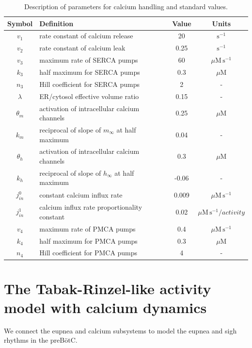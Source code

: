 \documentclass[12pt]{article}
\def\pre{preB\"otC\xspace}
\def\micromolar{\mu\mathrm{M}}
\def\persecond{\mathrm{s}^{-1}}
\def\micromolarpersecond{\mu\mathrm{M}\,\mathrm{s}^{-1}}
\def\jin{j_{in}}
\def\jinzero{\jin^0}
\def\jinone{\jin^1}
\def\minf{m_\infty}
\def\hinf{h_\infty}
\def\thetam{\theta_m}
\def\km{k_m}
\def\thetah{\theta_h}
\def\kh{k_h}
\begin{document}
\begin{table}[h!]
\centering 
\begin{tabular}{clcc}
    Symbol & Definition & Value &Units  \\
\hline 
\hline
$v_1$ & rate constant of calcium release & 20  & $\persecond$  \\
$v_2$ & rate constant of calcium leak   & 0.25 & $\persecond$ \\
$v_3$ & maximum rate of SERCA pumps & 60  &  $\micromolarpersecond$  \\
$k_3$ & half maximum for SERCA pumps  & 0.3 & $\micromolar$ \\
$n_3$ & Hill coefficient for SERCA pumps   & 2 & - \\
$\lambda$ & ER/cytosol effective volume ratio & 0.15 & - \\
$\thetam$ & activation of intracellular calcium channels & 0.25 & $\micromolar$ \\
$\km$ & reciprocal of slope of   $\minf$ at half maximum & 0.04 & - \\
$\thetah$ & activation of intracellular calcium channels & 0.3 & $\micromolar$\\
$\kh$ & reciprocal of slope of   $\hinf$ at half maximum & -0.06 & - \\
    \hline 
 $\jinzero$ & constant calcium influx rate  & 0.009 & $\micromolarpersecond$ \\
  $\jinone$ &  calcium influx rate  proportionality constant & 0.02 & $\micromolarpersecond/activity$ \\
  $v_4$ & maximum rate of PMCA pumps & 0.4  & $\micromolarpersecond$ \\
$k_4$ & half maximum for PMCA pumps  & 0.3 & $\micromolar$ \\
$n_4$ & Hill coefficient for PMCA pumps   & 4 & - \\

    \hline
\end{tabular}
\caption{Description of parameters for calcium handling and standard values.}
\label{ParamDefCalcium}
\end{table}

\clearpage
\section*{The Tabak-Rinzel-like activity model with calcium dynamics}

We connect the eupnea and calcium subsystems to model the eupnea and sigh rhythms in the \pre.
\end{document}
